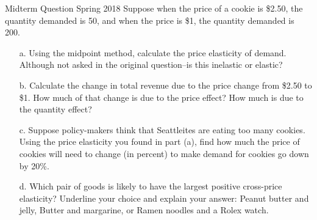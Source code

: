\documentclass{beamer}
\begin{document}
\begin{frame}{Midterm Question Spring 2018}
    Suppose when the price of a cookie is \$2.50, the quantity demanded is 50, and when the price is \$1, the quantity demanded is 200.
    \begin{itemize}
        \item[a.] Using the midpoint method, calculate the price elasticity of demand. Although not asked in the original question–is this inelastic or elastic?
        \item[b.] Calculate the change in total revenue due to the price change from \$2.50 to \$1. How much of that change is due to the price effect? How much is due to the quantity effect?
        \item[c.] Suppose policy-makers think that Seattleites are eating too many cookies. Using the price elasticity you found in part (a), find how much the price of cookies will need to change (in percent) to make demand for cookies go down by 20\%. 
        \item[d.] Which pair of goods is likely to have the largest positive cross-price elasticity? Underline your choice and explain your answer: Peanut butter and jelly, Butter and margarine, or Ramen noodles and a Rolex watch.
    \end{itemize}
\end{frame}
\end{document}
